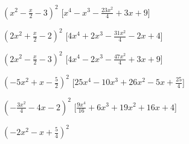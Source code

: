 \begin{esercizio}
\begin{enumeratea}
\item \(\left(x^{2} - \frac{x}{2} - 3\right)^{2}\)
  \hfill [\(x^{4} - x^{3} - \frac{23 x^{2}}{4} + 3 x + 9\)]
\item \(\left(2 x^{2} + \frac{x}{2} - 2\right)^{2}\)
  \hfill [\(4 x^{4} + 2 x^{3} - \frac{31 x^{2}}{4} - 2 x + 4\)]
\item \(\left(2 x^{2} - \frac{x}{2} - 3\right)^{2}\)
  \hfill [\(4 x^{4} - 2 x^{3} - \frac{47 x^{2}}{4} + 3 x + 9\)]
\item \(\left(- 5 x^{2} + x - \frac{5}{2}\right)^{2}\)
  \hfill [\(25 x^{4} - 10 x^{3} + 26 x^{2} - 5 x + \frac{25}{4}\)]
\item \(\left(- \frac{3 x^{2}}{4} - 4 x - 2\right)^{2}\)
  \hfill [\(\frac{9 x^{4}}{16} + 6 x^{3} + 19 x^{2} + 16 x + 4\)]
\item \(\left(- 2 x^{2} - x + \frac{5}{4}\right)^{2}\)

\end{enumeratea}
\end{esercizio}
